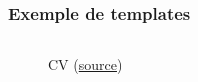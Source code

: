 \begin{frame}[fragile]
  \frametitle{Exemple de templates}

  \begin{columns}[c]
        \begin{figure}[h]
          \caption{CV (\href{https://www.latextemplates.com/template/developer-cv}{source})}
        \end{figure}
        \begin{figure}[h]

\end{figure}
\end{columns}
\end{frame}
